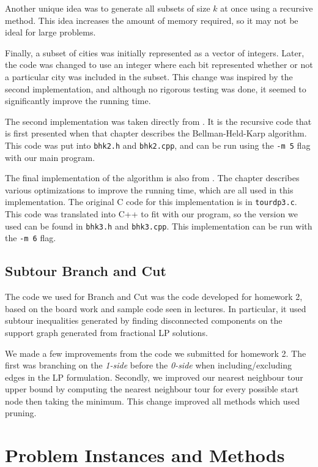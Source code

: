 \documentclass[11pt]{article}
\begin{document}
	Another unique idea was to generate all subsets of size $k$ at once using a recursive method. This idea increases the amount of memory required, so it may not be ideal for large problems.
	
	Finally, a subset of cities was initially represented as a vector of integers. Later, the code was changed to use an integer where each bit represented whether or not a particular city was included in the subset. This change was inspired by the second implementation, and although no rigorous testing was done, it seemed to significantly improve the running time.
	
	The second implementation was taken directly from \cite{bico}. It is the recursive code that is first presented when that chapter describes the Bellman-Held-Karp algorithm. This code was put into \texttt{bhk2.h} and \texttt{bhk2.cpp}, and can be run using the \texttt{-m 5} flag with our main program.
	
	The final implementation of the algorithm is also from \cite{bico}. The chapter describes various optimizations to improve the running time, which are all used in this implementation. The original C code for this implementation is in \texttt{tour{\textunderscore}dp3.c}. This code was translated into C++ to fit with our program, so the version we used can be found in \texttt{bhk3.h} and \texttt{bhk3.cpp}. This implementation can be run with the \texttt{-m 6} flag.
	
	\subsection{Subtour Branch and Cut}
	
	The code we used for Branch and Cut was the code developed for homework 2, based on the board work and sample code seen in lectures. In particular, it used subtour inequalities generated by finding disconnected components on the support graph generated from fractional LP solutions.
	
	We made a few improvements from the code we submitted for homework 2. The first was branching on the \emph{1-side} before the \emph{0-side} when including/excluding edges in the LP formulation. Secondly, we improved our nearest neighbour tour upper bound by computing the nearest neighbour tour for every possible start node then taking the minimum. This change improved all methods which used pruning. 
	
	\section{Problem Instances and Methods}
	\label{sec:methodology}
		
\end{document}

